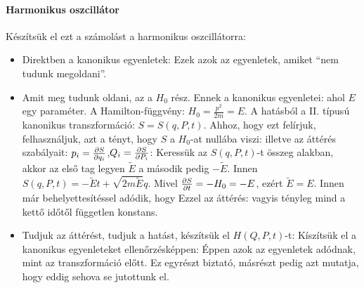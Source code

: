    \paragraph{Harmonikus oszcillátor}
    
    Készítsük el ezt a számolást a harmonikus oszcillátorra:
    \begin{itemize}
     \item Direktben a kanonikus egyenletek:
      Ezek azok az egyenletek, amiket ``nem tudunk megoldani''.
     \item Amit meg tudunk oldani, az a $H_0$ rész. Ennek a kanonikus egyenletei:
      ahol $E$ egy paraméter. A Hamilton-függvény: $H_0=\frac{p^2}{2m}=E$. A hatásból a II. típusú kanonikus transzformáció: $S=S(q,P,t)$. Ahhoz, hogy ezt felírjuk, felhasználjuk, azt a tényt, hogy $S$ a $H_0$-at nullába viszi:
      illetve az áttérés szabályait: $p_i=\frac{\partial S}{\partial q_i}$,$Q_i=\frac{\partial S}{\partial P_i}$:
      Keressük az $S(q,P,t)$-t összeg alakban, akkor az első tag legyen $\tilde E$ a második pedig $-\tilde E$. Innen $S(q,P,t)=-\tilde{E}t+\sqrt{2m\tilde{E}}q$. Mivel $\frac{\partial S}{\partial t}=-H_0=-E$, ezért $\tilde{E}=E$. Innen már behelyettesítéssel adódik, hogy 
      Ezzel az áttérés:
      vagyis tényleg mind a kettő időtől független konstans. 
      
     \item Tudjuk az áttérést, tudjuk a hatást, készítsük el $H(Q,P,t)$-t:
      Kíszítsük el a kanonikus egyenleteket ellenőrzésképpen:
      Éppen azok az egyenletek adódnak, mint az transzformáció előtt. Ez egyrészt biztató, másrészt pedig azt mutatja, hogy eddig sehova se jutottunk el. 
      

\end{itemize}
